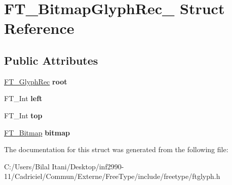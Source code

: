 \hypertarget{struct_f_t___bitmap_glyph_rec__}{}\section{F\+T\+\_\+\+Bitmap\+Glyph\+Rec\+\_\+ Struct Reference}
\label{struct_f_t___bitmap_glyph_rec__}
\subsection*{Public Attributes}
\begin{DoxyCompactItemize}
\item 
\hyperlink{struct_f_t___glyph_rec__}{F\+T\+\_\+\+Glyph\+Rec} {\bfseries root}\hypertarget{struct_f_t___bitmap_glyph_rec___ac3970353fbc0fe3d4c59c3fd608140f3}{}\label{struct_f_t___bitmap_glyph_rec___ac3970353fbc0fe3d4c59c3fd608140f3}

\item 
F\+T\+\_\+\+Int {\bfseries left}\hypertarget{struct_f_t___bitmap_glyph_rec___a6cfd2d89af7b6be4af886047c9cb7e0a}{}\label{struct_f_t___bitmap_glyph_rec___a6cfd2d89af7b6be4af886047c9cb7e0a}

\item 
F\+T\+\_\+\+Int {\bfseries top}\hypertarget{struct_f_t___bitmap_glyph_rec___a25fc81296678d6a2d064843c01bc05f7}{}\label{struct_f_t___bitmap_glyph_rec___a25fc81296678d6a2d064843c01bc05f7}

\item 
\hyperlink{struct_f_t___bitmap__}{F\+T\+\_\+\+Bitmap} {\bfseries bitmap}\hypertarget{struct_f_t___bitmap_glyph_rec___a16ecd0725920f8d5ad4c14e9448126ad}{}\label{struct_f_t___bitmap_glyph_rec___a16ecd0725920f8d5ad4c14e9448126ad}

\end{DoxyCompactItemize}


The documentation for this struct was generated from the following file\+:\begin{DoxyCompactItemize}
\item 
C\+:/\+Users/\+Bilal Itani/\+Desktop/inf2990-\/11/\+Cadriciel/\+Commun/\+Externe/\+Free\+Type/include/freetype/ftglyph.\+h\end{DoxyCompactItemize}

